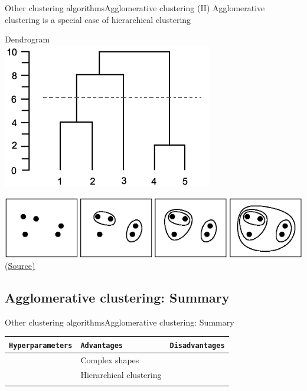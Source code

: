 \documentclass[10pt,compress]{beamer} %
\begin{document}
\begin{frame}{Other clustering algorithms}{Agglomerative clustering (II)}
    Agglomerative clustering is a special case of hierarchical clustering
    
    \bigskip

	\centering Dendrogram\\ \includegraphics[width=0.5\linewidth]{figs/dendrogram.png}

	\includegraphics[width=0.7\linewidth]{figs/agglomerative.png}\\
	\scriptsize\href{https://stackoverflow.com/questions/8016313/agglomerative-clustering-in-matlab}{(Source)}
\end{frame}


\subsection{Agglomerative clustering: Summary}
\begin{frame}{Other clustering algorithms}{Agglomerative clustering: Summary}
	\begin{center}
	\begin{tabular}{cp{3cm}p{3cm}}\hline
	 	\texttt{Hyperparameters}  & \texttt{Advantages}  & \texttt{Disadvantages} \\\hline
	 	                 & Complex shapes                &  \\
	                     & Hierarchical clustering        &  \\
	 	                 &         &  \\
	 	\hline
	\end{tabular}
	\end{center}
\end{frame}
\end{document}
